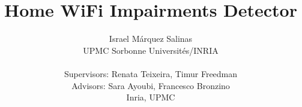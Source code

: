\documentclass[sigconf]{Template}
\begin{document}
\title{Home WiFi Impairments Detector}
\author{Israel M\'{a}rquez Salinas \\UPMC Sorbonne Universit\'{e}s/INRIA \\\\ { Supervisors: Renata Teixeira, Timur Freedman}\\ {Advisors: Sara Ayoubi, Francesco Bronzino} \\{Inria, UPMC} }

\maketitle










\end{document}
